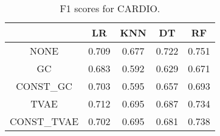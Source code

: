 \begin{table}
\caption{F1 scores for CARDIO.}
\label{tab:f1-CARDIO}
\begin{tabular}{ccccc}
\toprule
 & LR & KNN & DT & RF \\
\midrule
NONE & 0.709 & 0.677 & 0.722 & 0.751 \\
GC & 0.683 & 0.592 & 0.629 & 0.671 \\
CONST\_GC & 0.703 & 0.595 & 0.657 & 0.693 \\
TVAE & 0.712 & 0.695 & 0.687 & 0.734 \\
CONST\_TVAE & 0.702 & 0.695 & 0.681 & 0.738 \\
\bottomrule
\end{tabular}
\end{table}
